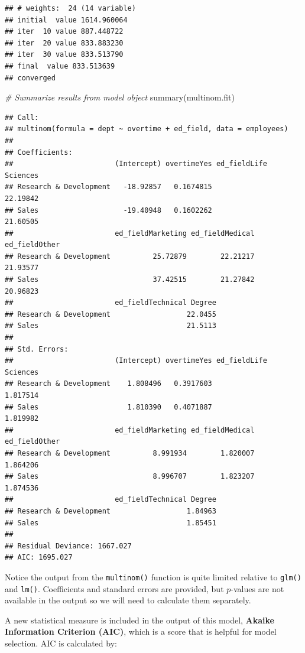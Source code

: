 \documentclass[
]{book}
\newenvironment{Shaded}{\begin{snugshade}}{\end{snugshade}}
\newcommand{\CommentTok}[1]{\textcolor[rgb]{0.56,0.35,0.01}{\textit{#1}}}
\newcommand{\FunctionTok}[1]{\textcolor[rgb]{0.00,0.00,0.00}{#1}}
\newcommand{\NormalTok}[1]{#1}
\begin{document}
\begin{verbatim}
## # weights:  24 (14 variable)
## initial  value 1614.960064 
## iter  10 value 887.448722
## iter  20 value 833.883230
## iter  30 value 833.513790
## final  value 833.513639 
## converged
\end{verbatim}

\begin{Shaded}
\begin{Highlighting}[]
\CommentTok{\# Summarize results from model object}
\FunctionTok{summary}\NormalTok{(multinom.fit)}
\end{Highlighting}
\end{Shaded}

\begin{verbatim}
## Call:
## multinom(formula = dept ~ overtime + ed_field, data = employees)
## 
## Coefficients:
##                        (Intercept) overtimeYes ed_fieldLife Sciences
## Research & Development   -18.92857   0.1674815              22.19842
## Sales                    -19.40948   0.1602262              21.60505
##                        ed_fieldMarketing ed_fieldMedical ed_fieldOther
## Research & Development          25.72879        22.21217      21.93577
## Sales                           37.42515        21.27842      20.96823
##                        ed_fieldTechnical Degree
## Research & Development                  22.0455
## Sales                                   21.5113
## 
## Std. Errors:
##                        (Intercept) overtimeYes ed_fieldLife Sciences
## Research & Development    1.808496   0.3917603              1.817514
## Sales                     1.810390   0.4071887              1.819982
##                        ed_fieldMarketing ed_fieldMedical ed_fieldOther
## Research & Development          8.991934        1.820007      1.864206
## Sales                           8.996707        1.823207      1.874536
##                        ed_fieldTechnical Degree
## Research & Development                  1.84963
## Sales                                   1.85451
## 
## Residual Deviance: 1667.027 
## AIC: 1695.027
\end{verbatim}

Notice the output from the \texttt{multinom()} function is quite limited relative to \texttt{glm()} and \texttt{lm()}. Coefficients and standard errors are provided, but \(p\)-values are not available in the output so we will need to calculate them separately.

A new statistical measure is included in the output of this model, \textbf{Akaike Information Criterion (AIC)}, which is a score that is helpful for model selection. AIC is calculated by:
\end{document}
